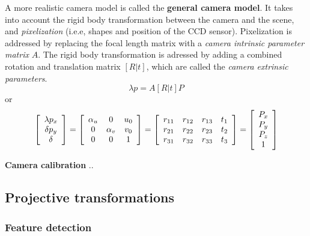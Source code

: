 {A more realistic camera model is called the \textbf{general camera model}.
It takes into account the rigid body transformation between the camera and the scene, and \textit{pixelization} (i.e.e, shapes and position of the CCD sensor).
Pixelization is addressed by replacing the focal length matrix with a \textit{camera intrinsic parameter matrix} $A$.
The rigid body transformation is adressed by adding a combined rotation and translation matrix $[R|t]$, which are called the \textit{camera extrinsic parameters}.
\begin{equation}
\lambda p = A [ R | t] P
\end{equation}
or
\begin{equation}
\left[ \begin{array}{c}
\lambda p_x \\
\delta p_y \\
\delta
\end{array} \right]
=
\left[ \begin{array}{c c c}
\alpha_u & 0 & u_0 \\
0 & \alpha_v & v_0 \\
0 & 0 & 1
\end{array} \right]
=
\left[ \begin{array}{c c c c}
r_{11} & r_{12} & r_{13} & t_1 \\
r_{21} & r_{22} & r_{23} & t_2 \\
r_{31} & r_{32} & r_{33} & t_3
\end{array} \right]
=
\left[ \begin{array}{c}
P_x \\
P_y \\
P_z \\
1
\end{array} \right]
\end{equation}

\textbf{Camera calibration} ..

		\subsection{Projective transformations}
			\subsubsection{Feature detection}
}
